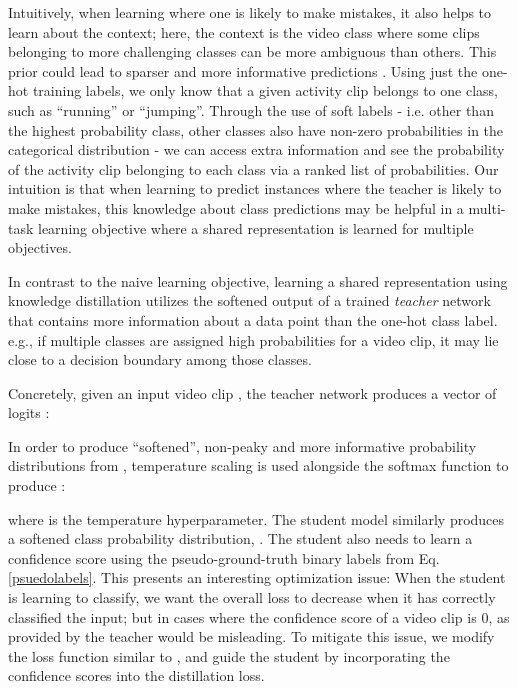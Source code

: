 \documentclass[a4paper,conference]{IEEEtran}
\begin{document}
Intuitively, when learning where one is likely to make mistakes, it also helps to learn about the context; here, the context is the video class where some clips belonging to more challenging classes can be more ambiguous than others. This prior could lead to sparser and more informative predictions \cite{paredes2012exploiting}. Using just the one-hot training labels, we only know that a given activity clip belongs to one class, such as \enquote{running} or \enquote{jumping}. Through the use of soft labels  \cite{hinton2015distilling} - i.e. other than the highest probability class, other classes also have non-zero probabilities in the categorical distribution - we can access extra information and see the probability of the activity clip belonging to each class via a ranked list of probabilities. Our intuition is that when learning to predict instances where the teacher is likely to make mistakes, this knowledge about class predictions may be helpful in a multi-task learning \cite{caruana1997multitask} objective where a shared representation is learned for multiple objectives.

In contrast to the naive learning objective, learning a shared representation using knowledge distillation utilizes the softened output of a trained \textit{teacher} network that contains more information about a data point than the one-hot class label. e.g., if multiple classes are assigned high probabilities for a video clip, it may lie close to a decision boundary among those classes. 

Concretely, given an input video clip , the teacher network  produces a vector of logits :



In order to produce \enquote{softened}, non-peaky and more informative probability distributions from , temperature scaling is used alongside the softmax function \cite{hinton2015distilling, guo2017calibration} to produce :




where  is the temperature hyperparameter. The student model  similarly produces a softened class probability distribution, . The student also needs to learn a confidence score  using the pseudo-ground-truth binary labels from Eq. \ref{psuedolabels}. This presents an interesting optimization issue: When the student is learning to classify, we want the overall loss to decrease when it has correctly classified the input; but in cases where the confidence score of a video clip is 0,  as provided by the teacher would be misleading. To mitigate this issue, we modify the loss function similar to \cite{kendall2017uncertainties, gurevich2018pairing, devries2018learning}, and guide the student by incorporating the confidence scores into the distillation loss. 
\end{document}
